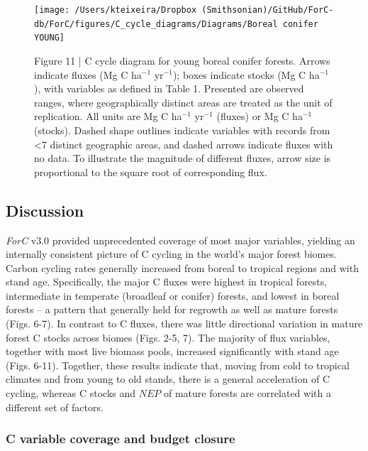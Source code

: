 \documentclass[
]{article}
\begin{document}
\begin{landscape}
\begin{figure}[H]

{\centering \texttt{[image: /Users/kteixeira/Dropbox (Smithsonian)/GitHub/ForC-db/ForC/figures/C\_cycle\_diagrams/Diagrams/Boreal conifer YOUNG]} 

}

\caption{Figure 11 | C cycle diagram for young boreal conifer forests. Arrows indicate fluxes (Mg C ha$^{-1}$ yr$^{-1}$); boxes indicate stocks (Mg C ha$^{-1}$), with variables as defined in Table 1. Presented are observed ranges, where geographically distinct areas are treated as the unit of replication. All units are Mg C ha$^{-1}$ yr$^{-1}$ (fluxes) or Mg C ha$^{-1}$ (stocks). Dashed shape outlines indicate variables with records from <7 distinct geographic areas, and dashed arrows indicate fluxes with no data. To illustrate the magnitude of different fluxes, arrow size is proportional to the square root of corresponding flux.}\label{fig:unnamed-chunk-18}
\end{figure}
\end{landscape}

\hypertarget{discussion}{%
\subsection{Discussion}\label{discussion}}

\emph{ForC} v3.0 provided unprecedented coverage of most major
variables, yielding an internally consistent picture of C cycling in the
world's major forest biomes. Carbon cycling rates generally increased
from boreal to tropical regions and with stand age. Specifically, the
major C fluxes were highest in tropical forests, intermediate in
temperate (broadleaf or conifer) forests, and lowest in boreal forests
-- a pattern that generally held for regrowth as well as mature forests
(Figs. 6-7). In contrast to C fluxes, there was little directional
variation in mature forest C stocks across biomes (Figs. 2-5, 7). The
majority of flux variables, together with most live biomass pools,
increased significantly with stand age (Figs. 6-11). Together, these
results indicate that, moving from cold to tropical climates and from
young to old stands, there is a general acceleration of C cycling,
whereas C stocks and \(NEP\) of mature forests are correlated with a
different set of factors.

\hypertarget{c-variable-coverage-and-budget-closure}{%
\subsubsection{C variable coverage and budget
closure}\label{c-variable-coverage-and-budget-closure}}
\end{document}
